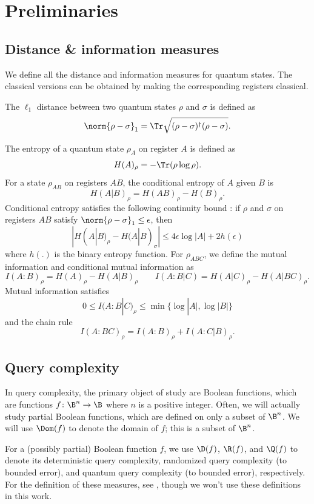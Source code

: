 \setcounter{section}{1}\setcounter{theorem}{8}\section{Preliminaries}
\subsection{Distance \& information measures}
We define all the distance and information measures for quantum states. The classical versions can be obtained by making the corresponding registers classical.

The $\ell_1$ distance between two quantum states $\rho$ and $\sigma$ is defined as
\[ \norm{\rho-\sigma}_1 = \Tr\sqrt{(\rho-\sigma)^\dagger(\rho-\sigma)}.\]

The entropy of a quantum state $\rho_A$ on register $A$ is defined as
\[H(A)_\rho = -\Tr(\rho\log\rho).\]
For a state $\rho_{AB}$ on registers $AB$, the conditional entropy of $A$ given $B$ is
\[ H(A|B)_\rho = H(AB)_\rho - H(B)_\rho.\]
Conditional entropy satisfies the following continuity bound \cite{AF04}: if $\rho$ and $\sigma$ on registers $AB$ satisfy $\norm{\rho-\sigma}_1 \leq \epsilon$, then
\[ |H(A|B)_\rho - H(A|B)_\sigma| \leq 4\epsilon\log|A| + 2h(\epsilon) \]
where $h(.)$ is the binary entropy function.
For $\rho_{ABC}$, we define the mutual information and conditional mutual information as
\[ I(A:B)_\rho = H(A)_\rho - H(A|B)_\rho \qquad I(A:B|C) = H(A|C)_\rho - H(A|BC)_\rho. \]
Mutual information satisfies
\[ 0 \leq I(A:B|C)_\rho \leq \min\{\log|A|,\log|B|\}\]
and the chain rule
\[ I(A:BC)_\rho = I(A:B)_\rho + I(A:C|B)_\rho.\]


\subsection{Query complexity}\label{sec:prelim_query}

In query complexity, the primary object of study
are Boolean functions, which are functions
$f\colon\B^n\to\B$ where $n$ is a positive integer. Often,
we will actually study partial Boolean functions, which
are defined on only a subset of $\B^n$. We will use
$\Dom(f)$ to denote the domain of $f$; this is a subset
of $\B^n$.

For a (possibly partial) Boolean function $f$, we use
$\D(f)$, $\R(f)$, and $\Q(f)$ to denote its deterministic
query complexity, randomized query complexity (to bounded error),
and quantum query complexity (to bounded error), respectively.
For the definition of these measures, see \cite{BdW02},
though we won't use these definitions in this work.

